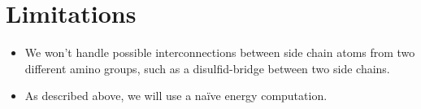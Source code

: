 \documentclass[10pt,a4paper,final,twoside,openany,article]{memoir}
\begin{document}
\section{Limitations}
\begin{itemize}
\item We won't handle possible interconnections between side chain
  atoms from two different amino groups, such as a disulfid-bridge
  between two side chains.
\item As described above, we will use a naïve energy computation.
\end{itemize}



\end{document}
